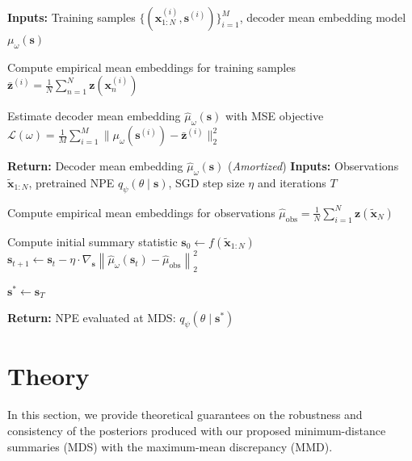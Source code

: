 \documentclass{article}
\theoremstyle{plain}
\theoremstyle{definition}
\theoremstyle{remark}
\begin{document}
\begin{algorithm}[tb]
  \caption{MMD minimum distance summary with SGD}
  \label{alg:mds}
  \begin{algorithmic}[1]
    \STATE \textbf{Inputs:} Training samples \( \{(\mathbf{x}_{1:N}^{(i)}, \mathbf{s}^{(i)})\}_{i=1}^M \), decoder mean embedding model \( \mu_\omega(\mathbf{s}) \)

    \STATE Compute empirical mean embeddings for training samples \( \bar{\mathbf{z}}^{(i)} = \frac{1}{N} \sum_{n=1}^N \mathbf{z}(\mathbf{x}_n^{(i)}) \)

    \STATE Estimate decoder mean embedding \( \hat{\mu}_\omega(\mathbf{s}) \) with MSE objective \( \mathcal{L}(\omega) = \frac{1}{M} \sum_{i=1}^M \| \mu_{\omega}(\mathbf{s}^{(i)}) - \bar{\mathbf{z}}^{(i)} \|^2_2 \)

    \STATE \textbf{Return:} Decoder mean embedding \( \hat{\mu}_\omega(\mathbf{s})  \) (\emph{Amortized})
    \STATE \textbf{Inputs:} Observations \( \tilde{\mathbf{x}}_{1:N} \), pretrained NPE \( q_\psi(\theta \mid \mathbf{s}) \), SGD step size \(\eta \) and iterations \( T\)

    \STATE Compute empirical mean embeddings for observations \( \hat{\mu}_{\mathrm{obs}} = \frac{1}{N} \sum_{i=1}^N \mathbf{z}(\tilde{\mathbf{x}}_N) \)

    \STATE Compute initial summary statistic \( \mathbf{s}_0 \leftarrow f(\tilde{\mathbf{x}}_{1:N}) \)
      \STATE $\mathbf{s}_{t+1} \leftarrow \mathbf{s}_t - \eta \cdot \nabla_{\mathbf{s}} \left\|\hat\mu_\omega(\mathbf{s}_t) - \hat\mu_{\mathrm{obs}}\right\|_2^2$
    \ENDFOR

    \STATE $\mathbf{s}^* \leftarrow \mathbf{s}_{T}$
    
    \STATE \textbf{Return:} NPE evaluated at MDS: $q_\psi(\theta\mid\mathbf{s}^*)$
  \end{algorithmic}
\end{algorithm}



\section{Theory}
\label{sec:theory}
In this section, we provide theoretical guarantees on the robustness and consistency of the posteriors produced with our proposed minimum-distance summaries (MDS) with the maximum-mean discrepancy (MMD). 
\end{document}
